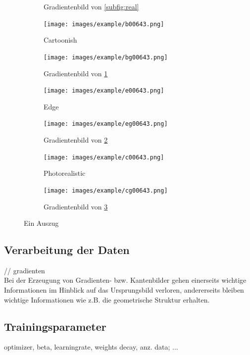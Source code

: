 \begin{figure}[htp]
\begin{subfigure}[b]{0.45\linewidth}
		\caption{Gradientenbild von \ref{subfig:real}}
	\end{subfigure}
	\hfill
	\begin{subfigure}[b]{0.45\linewidth}
		\centering
		\texttt{[image: images/example/b00643.png]}
		\caption{Cartoonish}
		\label{subfig:cartoonish}
	\end{subfigure}
	\hfill
	\begin{subfigure}[b]{0.45\linewidth}
		\centering
		\texttt{[image: images/example/bg00643.png]}
		\caption{Gradientenbild von \ref{subfig:cartoonish}}
	\end{subfigure}
	\hfill
	\begin{subfigure}[b]{0.45\linewidth}
		\centering
		\texttt{[image: images/example/e00643.png]}
		\caption{Edge}
		\label{subfig:edge}
	\end{subfigure}
	\hfill
	\begin{subfigure}[b]{0.45\linewidth}
		\centering
		\texttt{[image: images/example/eg00643.png]}
		\caption{Gradientenbild von \ref{subfig:edge}}
	\end{subfigure}
	\hfill
	\begin{subfigure}[b]{0.45\linewidth}
		\centering
		\texttt{[image: images/example/c00643.png]}
		\caption{Photorealistic}
		\label{subfig:photorealistic}
	\end{subfigure}
	\hfill
	\begin{subfigure}[b]{0.45\linewidth}
		\centering
		\texttt{[image: images/example/cg00643.png]}
		\caption{Gradientenbild von \ref{subfig:photorealistic}}
	\end{subfigure}
	\caption{Ein Auszug}
	\label{fig:dataset_preprocess}
\end{figure}
\vspace{\fill}

\subsection{Verarbeitung der Daten}
// gradienten\\
Bei der Erzeugung von Gradienten- bzw. Kantenbilder gehen einerseits wichtige Informationen im Hinblick auf das Ursprungsbild verloren, andererseits bleiben wichtige Informationen wie z.B. die geometrische Struktur erhalten.

\subsection{Trainingsparameter}
optimizer, beta,
learningrate,
weights decay, anz. data; ...